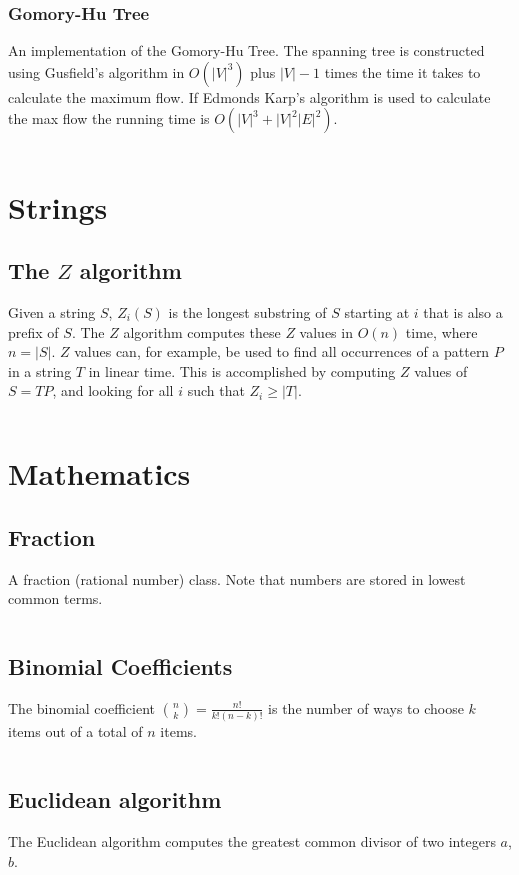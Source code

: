 \documentclass[8pt,a4paper]{amsart}
\newcommand{\code}[1]{\inputminted[linenos]{cpp}{_code/#1}}
\begin{document}
        \subsubsection{Gomory-Hu Tree}
        An implementation of the Gomory-Hu Tree. The spanning tree is constructed using Gusfield's algorithm
        in $O(|V| ^ 3)$ plus $|V|-1$ times the time it takes to calculate the maximum flow.
        If Edmonds Karp's algorithm is used to calculate the max flow the running time is $O(|V|^3 + |V|^2|E|^2)$.
        \code{graph/gomory_hu_tree.cpp}

\section{Strings}
    \subsection{The $Z$ algorithm}
        Given a string $S$, $Z_i(S)$ is the longest substring of $S$ starting
        at $i$ that is also a prefix of $S$. The $Z$ algorithm computes these
        $Z$ values in $O(n)$ time, where $n = |S|$. $Z$ values can, for
        example, be used to find all occurrences of a pattern $P$ in a string
        $T$ in linear time. This is accomplished by computing $Z$ values of $S
        = T P$, and looking for all $i$ such that $Z_i \geq |T|$.

        \code{strings/z_algorithm.cpp}

\section{Mathematics}
    \subsection{Fraction}
        A fraction (rational number) class. Note that numbers are stored in
        lowest common terms.
        \code{mathematics/fraction.cpp}

    \subsection{Binomial Coefficients}
        The binomial coefficient $\binom{n}{k} = \frac{n!}{k!(n-k)!}$ is the
        number of ways to choose $k$ items out of a total of $n$ items.
        \code{mathematics/nck.cpp}

    \subsection{Euclidean algorithm}
        The Euclidean algorithm computes the greatest common divisor of two
        integers $a$, $b$.
        \code{mathematics/gcd.cpp}
\end{document}
